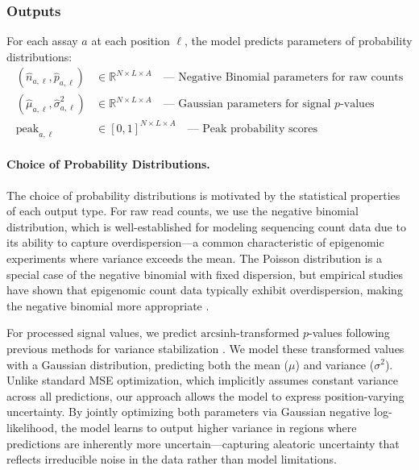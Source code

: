 \subsubsection{Outputs}

For each assay $a$ at each position $\ell$, the model predicts parameters of probability distributions:
\begin{align}
    (\hat{n}_{a,\ell}, \hat{p}_{a,\ell}) &\in \mathbb{R}^{N \times L \times A} \quad \text{--- Negative Binomial parameters for raw counts} \\
    (\hat{\mu}_{a,\ell}, \hat{\sigma}^2_{a,\ell}) &\in \mathbb{R}^{N \times L \times A} \quad \text{--- Gaussian parameters for signal } p\text{-values} \\
    \text{peak}_{a,\ell} &\in [0,1]^{N \times L \times A} \quad \text{--- Peak probability scores}
\end{align}

\paragraph{Choice of Probability Distributions.}
The choice of probability distributions is motivated by the statistical properties of each output type. For raw read counts, we use the negative binomial distribution, which is well-established for modeling sequencing count data due to its ability to capture overdispersion---a common characteristic of epigenomic experiments where variance exceeds the mean. The Poisson distribution is a special case of the negative binomial with fixed dispersion, but empirical studies have shown that epigenomic count data typically exhibit overdispersion, making the negative binomial more appropriate \cite{anders2010differential}. 

For processed signal values, we predict $\text{arcsinh}$-transformed $p$-values following previous methods for variance stabilization \cite{hoffman2012unsupervised}. We model these transformed values with a Gaussian distribution, predicting both the mean ($\mu$) and variance ($\sigma^2$). Unlike standard MSE optimization, which implicitly assumes constant variance across all predictions, our approach allows the model to express position-varying uncertainty. By jointly optimizing both parameters via Gaussian negative log-likelihood, the model learns to output higher variance in regions where predictions are inherently more uncertain---capturing aleatoric uncertainty that reflects irreducible noise in the data rather than model limitations.

